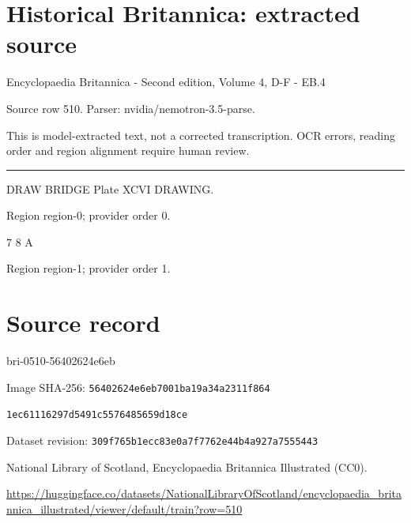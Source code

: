 \documentclass[11pt]{article}
\begin{document}
\section*{Historical Britannica: extracted source}
Encyclopaedia Britannica - Second edition, Volume 4, D-F - EB.4\par
{\small Source row 510. Parser: nvidia/nemotron-3.5-parse.\par}
{\small This is model-extracted text, not a corrected transcription. OCR errors, reading order and region alignment require human review.\par}
\hrule\medskip
DRAW BRIDGE
Plate XCVI
DRAWING.
\par

{\scriptsize\color{gray} Region region-0; provider order 0.\par}
\medskip

7
8
A
\par

{\scriptsize\color{gray} Region region-1; provider order 1.\par}
\medskip
\newpage\section*{Source record}
bri-0510-56402624e6eb\par
Image SHA-256: \texttt{56402624e6eb7001ba19a34a2311f864}\par\texttt{1ec61116297d5491c5576485659d18ce}\par
Dataset revision: \texttt{309f765b1ecc83e0a7f7}\texttt{762e44b4a927a7555443}\par
National Library of Scotland, Encyclopaedia Britannica Illustrated (CC0).\par
\url{https://huggingface.co/datasets/NationalLibraryOfScotland/encyclopaedia_britannica_illustrated/viewer/default/train?row=510}
\end{document}
